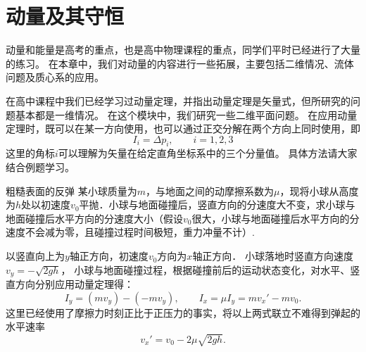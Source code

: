 

\chapter{动量及其守恒}
动量和能量是高考的重点，也是高中物理课程的重点，同学们平时已经进行了大量的练习。
在本章中，我们对动量的内容进行一些拓展，主要包括二维情况、流体问题及质心系的应用。


 在高中课程中我们已经学习过动量定理，并指出动量定理是矢量式，但所研究的问题基本都是一维情况。
 在这个模块中，我们研究一些二维平面问题。
 在应用动量定理时，既可以在某一方向使用，也可以通过正交分解在两个方向上同时使用，即
 \begin{equation}
 	I_i = \Delta p_i,\qquad i=1,2,3
 \end{equation}
 这里的角标$ i $可以理解为矢量在给定直角坐标系中的三个分量值。
 具体方法请大家结合例题学习。
 
 
 \begin{app}{粗糙表面的反弹}{}
 	某小球质量为$ m $，与地面之间的动摩擦系数为$ \mu $，现将小球从高度为$ h $处以初速度$ v_0 $平抛．小球与地面碰撞后，竖直方向的分速度大不变，求小球与地面碰撞后水平方向的分速度大小（假设$ v_0 $很大，小球与地面碰撞后水平方向的分速度不会减为零，且碰撞过程时间极短，重力冲量不计）.
 	\tcblower
 	
 	以竖直向上为$ y $轴正方向，初速度$ v_0 $方向为$ x $轴正方向．
 	 	小球落地时竖直方向速度$ v_y = -\sqrt{2gh} $，
 	小球与地面碰撞过程，根据碰撞前后的运动状态变化，对水平、竖直方向分别应用动量定理得：
 	\[
 	I_y=(mv_y)-(-mv_y),\qquad I_x = \mu I_y = mv_x'-mv_0.
 	\]
 	这里已经使用了摩擦力时刻正比于正压力的事实，将以上两式联立不难得到弹起的水平速率
 	\[
 	v_x' = v_0-2\mu\sqrt{2gh}.
 	\]
 
 	
 \end{app}
 

